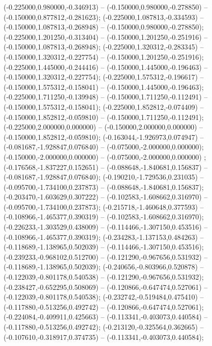  (-0.225000,0.980000,-0.346913) -- (-0.150000,0.980000,-0.278850) -- (-0.150000,0.877812,-0.281623);
 (-0.225000,1.087813,-0.334593) -- (-0.150000,1.087813,-0.268948) -- (-0.150000,0.980000,-0.278850);
 (-0.225000,1.201250,-0.313404) -- (-0.150000,1.201250,-0.251916) -- (-0.150000,1.087813,-0.268948);
 (-0.225000,1.320312,-0.283345) -- (-0.150000,1.320312,-0.227754) -- (-0.150000,1.201250,-0.251916);
 (-0.225000,1.445000,-0.244416) -- (-0.150000,1.445000,-0.196463) -- (-0.150000,1.320312,-0.227754);
 (-0.225000,1.575312,-0.196617) -- (-0.150000,1.575312,-0.158041) -- (-0.150000,1.445000,-0.196463);
 (-0.225000,1.711250,-0.139948) -- (-0.150000,1.711250,-0.112491) -- (-0.150000,1.575312,-0.158041);
 (-0.225000,1.852812,-0.074409) -- (-0.150000,1.852812,-0.059810) -- (-0.150000,1.711250,-0.112491);
 (-0.225000,2.000000,0.000000) -- (-0.150000,2.000000,0.000000) -- (-0.150000,1.852812,-0.059810);
 (-0.163044,-1.926973,0.074947) -- (-0.081687,-1.928847,0.076840) -- (-0.075000,-2.000000,0.000000);
 (-0.150000,-2.000000,0.000000) -- (-0.075000,-2.000000,0.000000) ;
 (-0.176568,-1.837227,0.152651) -- (-0.088648,-1.840681,0.156837) -- (-0.081687,-1.928847,0.076840);
 (-0.190210,-1.729536,0.231035) -- (-0.095700,-1.734100,0.237873) -- (-0.088648,-1.840681,0.156837);
 (-0.203470,-1.603629,0.307222) -- (-0.102583,-1.608662,0.316970) -- (-0.095700,-1.734100,0.237873);
 (-0.215718,-1.460648,0.377593) -- (-0.108966,-1.465377,0.390319) -- (-0.102583,-1.608662,0.316970);
 (-0.226233,-1.303529,0.438009) -- (-0.114466,-1.307150,0.453516) -- (-0.108966,-1.465377,0.390319);
 (-0.234283,-1.137153,0.484263) -- (-0.118689,-1.138965,0.502039) -- (-0.114466,-1.307150,0.453516);
 (-0.239233,-0.968102,0.512700) -- (-0.121290,-0.967656,0.531932) -- (-0.118689,-1.138965,0.502039);
 (-0.240656,-0.803966,0.520878) -- (-0.122039,-0.801178,0.540538) -- (-0.121290,-0.967656,0.531932);
 (-0.238427,-0.652295,0.508069) -- (-0.120866,-0.647474,0.527061) -- (-0.122039,-0.801178,0.540538);
 (-0.232742,-0.519484,0.475410) -- (-0.117880,-0.513256,0.492742) -- (-0.120866,-0.647474,0.527061);
 (-0.224084,-0.409911,0.425663) -- (-0.113341,-0.403073,0.440584) -- (-0.117880,-0.513256,0.492742);
 (-0.213120,-0.325564,0.362665) -- (-0.107610,-0.318917,0.374735) -- (-0.113341,-0.403073,0.440584);
